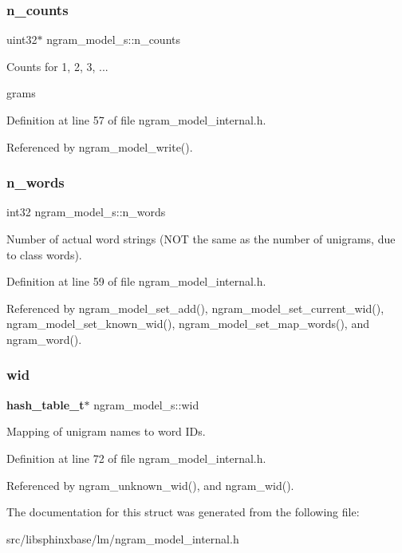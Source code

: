 \subsubsection{n\+\_\+counts}
{\footnotesize\ttfamily uint32$\ast$ ngram\+\_\+model\+\_\+s\+::n\+\_\+counts}



Counts for 1, 2, 3, ... 

grams 

Definition at line 57 of file ngram\+\_\+model\+\_\+internal.\+h.



Referenced by ngram\+\_\+model\+\_\+write().

\mbox{\label{structngram__model__s_a74f85927ef0d5513a1e6c02d13864be3}} 
\subsubsection{n\+\_\+words}
{\footnotesize\ttfamily int32 ngram\+\_\+model\+\_\+s\+::n\+\_\+words}



Number of actual word strings (N\+OT the same as the number of unigrams, due to class words). 



Definition at line 59 of file ngram\+\_\+model\+\_\+internal.\+h.



Referenced by ngram\+\_\+model\+\_\+set\+\_\+add(), ngram\+\_\+model\+\_\+set\+\_\+current\+\_\+wid(), ngram\+\_\+model\+\_\+set\+\_\+known\+\_\+wid(), ngram\+\_\+model\+\_\+set\+\_\+map\+\_\+words(), and ngram\+\_\+word().

\mbox{\label{structngram__model__s_a75567419a8002ef6e916c81f5d9ee9ed}} 
\subsubsection{wid}
{\footnotesize\ttfamily \textbf{ hash\+\_\+table\+\_\+t}$\ast$ ngram\+\_\+model\+\_\+s\+::wid}



Mapping of unigram names to word I\+Ds. 



Definition at line 72 of file ngram\+\_\+model\+\_\+internal.\+h.



Referenced by ngram\+\_\+unknown\+\_\+wid(), and ngram\+\_\+wid().



The documentation for this struct was generated from the following file\+:\begin{DoxyCompactItemize}
\item 
src/libsphinxbase/lm/ngram\+\_\+model\+\_\+internal.\+h\end{DoxyCompactItemize}
